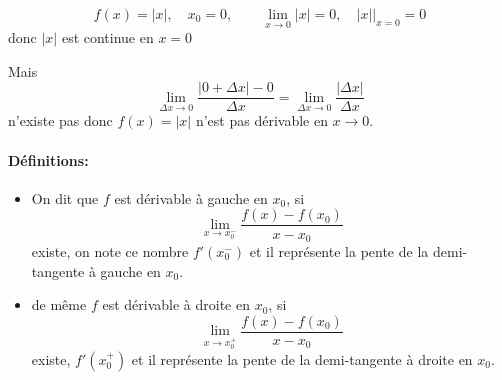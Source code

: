\documentclass[
    11pt,
    a4paper,
    oneside,
    headinlcude, footinclude,
    twoside,
]{report}
\begin{document}
\begin{center}
 \begin{minipage}{.4\linewidth}
 \end{minipage}
 \begin{minipage}{.59\linewidth}
     \setlength{\parskip}{.3em}
     $$f(x) = |x|, \quad x_{0} = 0, \quad \quad \lim_{x \to 0} |x| = 0, \quad |x|\Bigr|_{x = 0} = 0$$
     donc $|x|$ est continue en $x = 0$

     Mais $$\lim_{\Delta x \to 0} \frac{|0+\Delta x| - 0}{\Delta x} = \lim_{\Delta
         x\to 0} \frac{|\Delta x|}{\Delta x}$$
    n'existe pas donc $f(x) = |x|$ n'est pas dérivable en $x \to 0$.
 \end{minipage}
\end{center}


\paragraph{Définitions:}

\begin{itemize}
    \item On dit que $f$ est dérivable à gauche en $x_{0}$, si $$\lim_{x \to x_{0}^{-}} \frac{f(x) - f(x_{0})}{x - x_{0}}$$
        existe, on note ce nombre $f'(x_{0}^{-})$ et il représente la pente de
        la demi-tangente à gauche en $x_{0}$.
    \item de même  $f$ est dérivable à droite en $x_{0}$, si $$\lim_{x \to
            x_{0}^{+}} \frac{f(x) - f(x_{0})}{x - x_{0}}$$
        existe, $f'(x_{0}^{+})$ et il représente la pente de
        la demi-tangente à droite en $x_{0}$.
\end{itemize}
\end{document}
